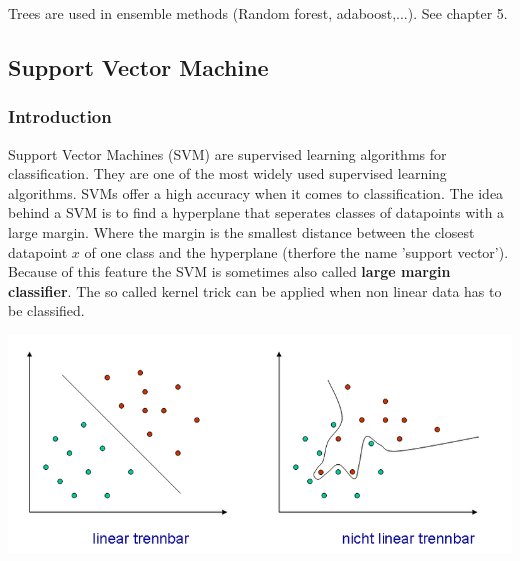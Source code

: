 Trees are used in ensemble methods (Random forest, adaboost,...). See chapter 5.

\subsection{Support Vector Machine}
\subsubsection{Introduction}

Support Vector Machines (SVM) are supervised learning algorithms for classification.
They are one of the most widely used supervised learning algorithms. 
SVMs offer a high accuracy when it comes to classification.
The idea behind a SVM is to find a hyperplane that seperates classes of datapoints with a large margin. Where the margin is the smallest distance between the closest datapoint $x$ of one class and the hyperplane (therfore the name 'support vector'). Because of this feature the SVM is sometimes also called \textbf{large margin classifier}.
The so called kernel trick can be applied when non linear data has to be classified.

\includegraphics[scale=0.5]{Images/svm.png}


